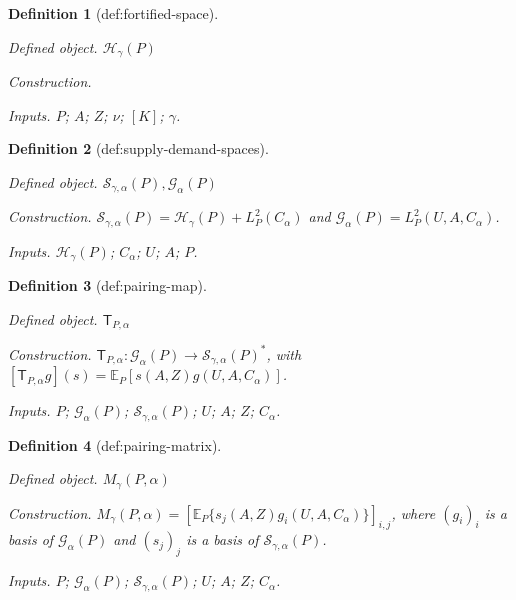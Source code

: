 \documentclass{article}
\newtheorem{definition}{Definition}
\begin{document}
\begin{definition}[def:fortified-space]\label{def:fortified-space}
\par\smallskip\noindent\emph{Defined object.} \(\mathcal H_\gamma(P)\)
\par\smallskip\noindent\emph{Construction.} \par\noindent {}\par\noindent
\par\smallskip\noindent\emph{Inputs.} \(P\); \(A\); \(Z\); \(\nu\); \([K]\); \(\gamma\).
\end{definition}

\begin{definition}[def:supply-demand-spaces]\label{def:supply-demand-spaces}
\par\smallskip\noindent\emph{Defined object.} \(\mathcal S_{\gamma,\alpha}(P),\mathcal G_\alpha(P)\)
\par\smallskip\noindent\emph{Construction.} \(\mathcal S_{\gamma,\alpha}(P)=\mathcal H_\gamma(P)+L_P^2(C_\alpha)\) and \(\mathcal G_\alpha(P)=L_P^2(U,A,C_\alpha)\).
\par\smallskip\noindent\emph{Inputs.} \(\mathcal H_\gamma(P)\); \(C_\alpha\); \(U\); \(A\); \(P\).
\end{definition}

\begin{definition}[def:pairing-map]\label{def:pairing-map}
\par\smallskip\noindent\emph{Defined object.} \(\mathsf T_{P,\alpha}\)
\par\smallskip\noindent\emph{Construction.} \(\mathsf T_{P,\alpha}:\mathcal G_\alpha(P)\to\mathcal S_{\gamma,\alpha}(P)^\ast\), with \([\mathsf T_{P,\alpha}g](s)=\mathbb E_P[s(A,Z)g(U,A,C_\alpha)]\).
\par\smallskip\noindent\emph{Inputs.} \(P\); \(\mathcal G_\alpha(P)\); \(\mathcal S_{\gamma,\alpha}(P)\); \(U\); \(A\); \(Z\); \(C_\alpha\).
\end{definition}

\begin{definition}[def:pairing-matrix]\label{def:pairing-matrix}
\par\smallskip\noindent\emph{Defined object.} \(M_\gamma(P,\alpha)\)
\par\smallskip\noindent\emph{Construction.} \(M_\gamma(P,\alpha)=[\mathbb E_P\{s_j(A,Z)g_i(U,A,C_\alpha)\}]_{i,j}\), where \((g_i)_i\) is a basis of \(\mathcal G_\alpha(P)\) and \((s_j)_j\) is a basis of \(\mathcal S_{\gamma,\alpha}(P)\).
\par\smallskip\noindent\emph{Inputs.} \(P\); \(\mathcal G_\alpha(P)\); \(\mathcal S_{\gamma,\alpha}(P)\); \(U\); \(A\); \(Z\); \(C_\alpha\).
\end{definition}
\end{document}
